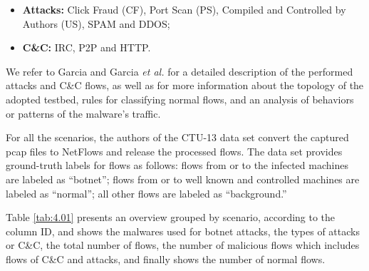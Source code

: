 \begin{itemize}
	\item \textbf{Attacks:} Click Fraud (CF), Port Scan (PS), Compiled and Controlled by Authors (US), SPAM and DDOS;
	\item \textbf{C\&C:} IRC, P2P and HTTP.
\end{itemize}

We refer to Garcia \cite{garcia2014identifying} and Garcia \emph{et al.} \cite{garcia2014empirical} for a detailed description of the performed attacks and C\&C flows, as well as for more information about the topology of the adopted testbed, rules for classifying normal flows, and an analysis of behaviors or patterns of the malware's traffic.

For all the scenarios, the authors of the CTU-13 data set convert the captured pcap files to NetFlows and release the processed flows. The data set provides ground-truth labels for flows as follows: flows from or to the infected machines are labeled as “botnet”; flows from or to well known and controlled machines are labeled as “normal”; all other flows are labeled as “background.”

Table \ref{tab:4.01} presents an overview grouped by scenario, according to the column ID, and shows the malwares used for botnet attacks, the types of attacks or C\&C, the total number of flows, the number of malicious flows which includes flows of C\&C and attacks, and finally shows the number of normal flows.

